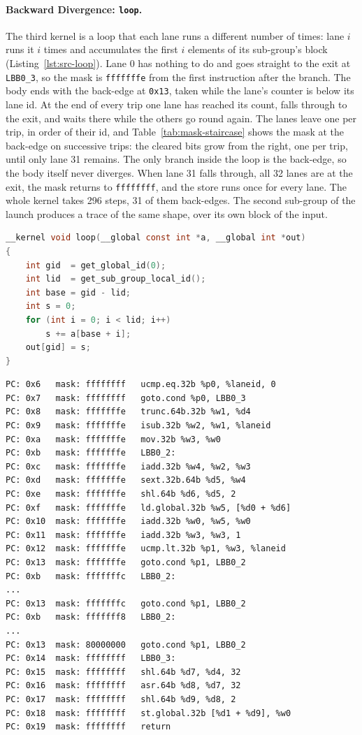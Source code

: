 \paragraph{Backward Divergence: \texttt{loop}.}
The third kernel is a loop that each lane runs a different number of
times: lane $i$ runs it $i$ times and accumulates the first $i$
elements of its sub-group's block (Listing~\ref{lst:src-loop}).
Lane 0 has nothing to do and goes straight to the exit at
\texttt{LBB0\_3}, so the mask is \texttt{fffffffe} from the first
instruction after the branch. The body ends with the back-edge at
\texttt{0x13}, taken while the lane's counter is below its lane id. At
the end of every trip one lane has reached its count, falls through to
the exit, and waits there while the others go round again. The lanes
leave one per trip, in order of their id, and
Table~\ref{tab:mask-staircase} shows the mask at the back-edge on
successive trips: the cleared bits grow from the right, one per trip,
until only lane 31 remains. The only branch inside the loop is the
back-edge, so the body itself never diverges. When lane 31 falls
through, all 32 lanes are at the exit, the mask returns to
\texttt{ffffffff}, and the store runs once for every lane. The whole
kernel takes 296 steps, 31 of them back-edges. The second sub-group of
the launch produces a trace of the same shape, over its own block of
the input.

\begin{lstlisting}[language=C, caption={[Source of loop]OpenCL source
of \texttt{loop}.}, label={lst:src-loop}]
__kernel void loop(__global const int *a, __global int *out)
{
    int gid  = get_global_id(0);
    int lid  = get_sub_group_local_id();
    int base = gid - lid;
    int s = 0;
    for (int i = 0; i < lid; i++)
        s += a[base + i];
    out[gid] = s;
}
\end{lstlisting}

\begin{lstlisting}[caption={[Trace of loop]Trace of \texttt{loop},
abridged: the first back-edge, the last one, and the exit.},
label={lst:trace-loop}]
PC: 0x6   mask: ffffffff   ucmp.eq.32b %p0, %laneid, 0
PC: 0x7   mask: ffffffff   goto.cond %p0, LBB0_3
PC: 0x8   mask: fffffffe   trunc.64b.32b %w1, %d4
PC: 0x9   mask: fffffffe   isub.32b %w2, %w1, %laneid
PC: 0xa   mask: fffffffe   mov.32b %w3, %w0
PC: 0xb   mask: fffffffe   LBB0_2:
PC: 0xc   mask: fffffffe   iadd.32b %w4, %w2, %w3
PC: 0xd   mask: fffffffe   sext.32b.64b %d5, %w4
PC: 0xe   mask: fffffffe   shl.64b %d6, %d5, 2
PC: 0xf   mask: fffffffe   ld.global.32b %w5, [%d0 + %d6]
PC: 0x10  mask: fffffffe   iadd.32b %w0, %w5, %w0
PC: 0x11  mask: fffffffe   iadd.32b %w3, %w3, 1
PC: 0x12  mask: fffffffe   ucmp.lt.32b %p1, %w3, %laneid
PC: 0x13  mask: fffffffe   goto.cond %p1, LBB0_2
PC: 0xb   mask: fffffffc   LBB0_2:
...
PC: 0x13  mask: fffffffc   goto.cond %p1, LBB0_2
PC: 0xb   mask: fffffff8   LBB0_2:
...
PC: 0x13  mask: 80000000   goto.cond %p1, LBB0_2
PC: 0x14  mask: ffffffff   LBB0_3:
PC: 0x15  mask: ffffffff   shl.64b %d7, %d4, 32
PC: 0x16  mask: ffffffff   asr.64b %d8, %d7, 32
PC: 0x17  mask: ffffffff   shl.64b %d9, %d8, 2
PC: 0x18  mask: ffffffff   st.global.32b [%d1 + %d9], %w0
PC: 0x19  mask: ffffffff   return
\end{lstlisting}

